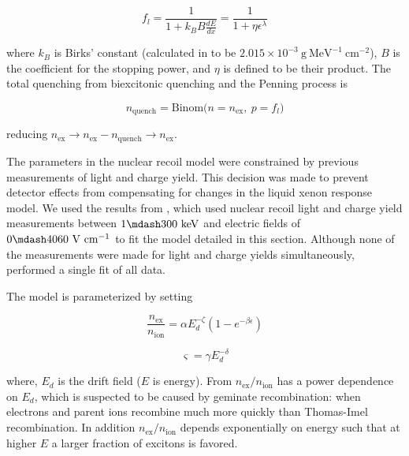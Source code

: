 \begin{equation}
f_l = \frac{1}{1 + k_{B}B \frac{dE}{dx}} = \frac{1}{1 + \eta \epsilon^{\lambda}}
\label{eq:er_nr_calibrations_parameter_determ_nr_birks}
\end{equation}

\noindent where $k_B$ is Birks' constant (calculated in  to be $2.015 \times 10^{-3}\ \mathrm{g\ MeV^{-1}\ cm^{-2}}$),
$B$ is the coefficient for the stopping power, and $\eta$ is defined to be their product.  The total quenching from biexcitonic
quenching and the Penning process is

\begin{equation}
n_{\mathrm{quench}} = \mathrm{Binom} \big( n = n_{\mathrm{ex}},\ p = f_l \big)
\end{equation}

\noindent reducing $n_{\mathrm{ex}} \rightarrow n_{\mathrm{ex}} - n_{\mathrm{quench}} \rightarrow n_{\mathrm{ex}}$.

The parameters in the nuclear recoil model were constrained by previous measurements of light and charge
yield.  This decision was made to prevent detector effects from compensating for changes
in the liquid xenon response model.  We used the results from , which used nuclear recoil light and charge yield
measurements between $1 \mdash 300\ \mathrm{keV}$ and electric fields of $0 \mdash 4060\ \mathrm{V\ cm^{-1}}$ to fit the model
detailed in this section.  Although none of the measurements were made for light and charge yields simultaneously, 
performed a single fit of all data.

The model is parameterized by setting

\begin{equation}
\frac{n_{\mathrm{ex}}}{n_{\mathrm{ion}}} = \alpha E_{d}^{-\zeta} ( 1 - e^{-\beta \epsilon})
\label{eq:er_nr_calibrations_parameter_determ_nr_nex_nion}
\end{equation}

\begin{equation}
\varsigma = \gamma E_{d}^{- \delta}
\label{eq:er_nr_calibrations_parameter_determ_nr_recomb_sigma}
\end{equation}

\noindent where, $E_d$ is the drift field ($E$ is energy).  From 
$n_{\mathrm{ex}} / n_{\mathrm{ion}}$ has a power dependence on $E_d$,
which is suspected to be caused by geminate recombination: when electrons and parent ions recombine much more quickly than Thomas-Imel
recombination.  In addition $n_{\mathrm{ex}} / n_{\mathrm{ion}}$ depends exponentially on energy such that at higher $E$ a larger fraction
of excitons is favored.

